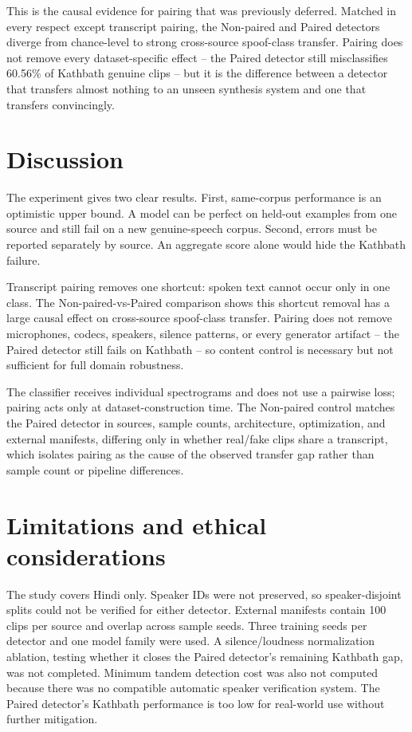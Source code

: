 \documentclass[3p,times,procedia]{elsarticle}
\begin{document}
This is the causal evidence for pairing that was previously deferred.
Matched in every respect except transcript pairing, the Non-paired and
Paired detectors diverge from chance-level to strong cross-source
spoof-class transfer. Pairing does not remove every dataset-specific effect
-- the Paired detector still misclassifies 60.56\% of Kathbath genuine
clips -- but it is the difference between a detector that transfers almost
nothing to an unseen synthesis system and one that transfers convincingly.

\section{Discussion}
The experiment gives two clear results. First, same-corpus performance is an
optimistic upper bound. A model can be perfect on held-out examples from one
source and still fail on a new genuine-speech corpus. Second, errors must be
reported separately by source. An aggregate score alone would hide the
Kathbath failure.

Transcript pairing removes one shortcut: spoken text cannot occur only in
one class. The Non-paired-vs-Paired comparison shows this shortcut removal
has a large causal effect on cross-source spoof-class transfer. Pairing
does not remove microphones, codecs, speakers, silence patterns, or every
generator artifact -- the Paired detector still fails on Kathbath -- so
content control is necessary but not sufficient for full domain robustness.

The classifier receives individual spectrograms and does not use a
pairwise loss; pairing acts only at dataset-construction time. The
Non-paired control matches the Paired detector in sources, sample counts,
architecture, optimization, and external manifests, differing only in
whether real/fake clips share a transcript, which isolates pairing as the
cause of the observed transfer gap rather than sample count or pipeline
differences.

\section{Limitations and ethical considerations}
The study covers Hindi only. Speaker IDs were not preserved, so
speaker-disjoint splits could not be verified for either detector. External
manifests contain 100 clips per source and overlap across sample seeds. Three
training seeds per detector and one model family were used. A
silence/loudness normalization ablation, testing whether it closes the
Paired detector's remaining Kathbath gap, was not completed. Minimum
tandem detection cost was also not computed because there was no compatible
automatic speaker verification system. The Paired detector's Kathbath
performance is too low for real-world use without further mitigation.
\end{document}

